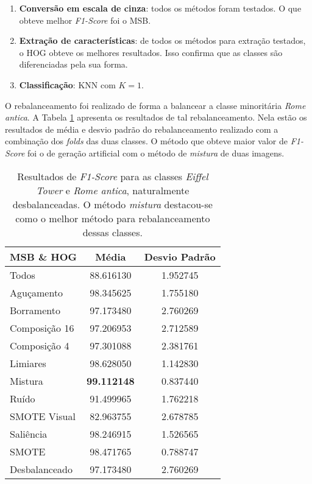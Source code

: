 \begin{enumerate}
\item \textbf{Conversão em escala de cinza}: todos os métodos foram testados. O que obteve melhor \textit{F1-Score} foi o MSB.
\item \textbf{Extração de características}: de todos os métodos para extração testados, o HOG obteve os melhores resultados. Isso confirma que as classes são diferenciadas pela sua forma.
\item \textbf{Classificação}: KNN com $K=1$.
\end{enumerate}


O rebalanceamento foi realizado de forma a balancear a classe minoritária \textit{Rome antica}. A Tabela \ref{tab:resultados:4.1} apresenta os resultados de tal rebalanceamento. Nela estão os resultados de média e desvio padrão do rebalanceamento realizado com a combinação dos \textit{folds} das duas classes. O método que obteve maior valor de \textit{F1-Score} foi o de geração artificial com o método de \emph{mistura} de duas imagens.

\begin{table}[!htbp]
\begin{center}
\caption{Resultados de \textit{F1-Score} para as classes \textit{Eiffel Tower} e \textit{Rome antica}, naturalmente desbalanceadas. O método \textit{mistura} destacou-se como o melhor método para rebalanceamento dessas classes.}
\label{tab:resultados:4.1}
\begin{tabular}{|l|c|c|}
\hline
\textbf{MSB \& HOG} & \textbf{Média}     & \textbf{Desvio Padrão} \\ \hline
   Todos        &  88.616130 &  1.952745  \\ \hline
  Aguçamento    &  98.345625 &  1.755180  \\ \hline
  Borramento    &  97.173480 &  2.760269  \\ \hline
  Composição 16 &  97.206953 &  2.712589  \\ \hline
  Composição 4  &  97.301088 &  2.381761  \\ \hline
  Limiares      &  98.628050 &  1.142830  \\ \hline
  Mistura       &  \textbf{99.112148} &  0.837440  \\ \hline
  Ruído         &  91.499965 &  1.762218  \\ \hline
  SMOTE Visual  &  82.963755 &  2.678785  \\ \hline
  Saliência     &  98.246915 &  1.526565  \\ \hline
 SMOTE          &  98.471765 &  0.788747  \\ \hline
Desbalanceado   &  97.173480 &  2.760269  \\ \hline
\end{tabular}
\end{center}
\end{table}

